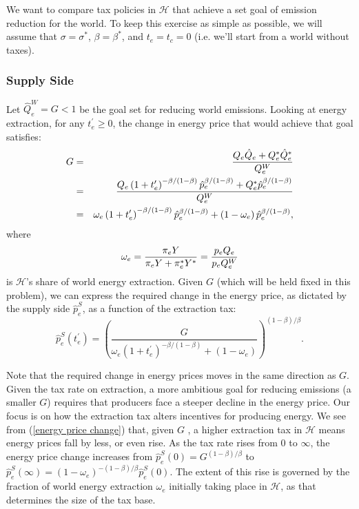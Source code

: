 \documentclass[notitlepage,12pt]{article}
\begin{document}
We want to compare tax policies in $\mathcal{H}$ that achieve a set goal of
emission reduction for the world. To keep this exercise as simple as
possible, we will assume that $\sigma =\sigma ^{\ast }$, $\beta =\beta
^{\ast }$, and $t_{e}=t_{c}=0$ (i.e. we'll start from a world without taxes).

\subsubsection{Supply Side}

Let $\hat{Q}_{e}^{W}=G<1$ be the goal set for reducing world emissions.
Looking at energy extraction, for any $t_{e}^{\prime }\geq 0$, the change in
energy price that would achieve that goal satisfies:%
\begin{eqnarray*}
G &=&\frac{Q_{e}\hat{Q}_{e}+Q_{e}^{\ast }\hat{Q}_{e}^{\ast }}{Q_{e}^{W}} \\
&=&\frac{Q_{e}\left( 1+t_{e}^{\prime }\right) ^{-\beta /(1-\beta )}\hat{p}%
_{e}^{\beta /(1-\beta )}+Q_{e}^{\ast }\hat{p}_{e}^{\beta /(1-\beta )}}{%
Q_{e}^{W}} \\
&=&\omega _{e}\left( 1+t_{e}^{\prime }\right) ^{-\beta /(1-\beta )}\hat{p}%
_{e}^{\beta /(1-\beta )}+\left( 1-\omega _{e}\right) \hat{p}_{e}^{\beta
/(1-\beta )},
\end{eqnarray*}%
where%
\begin{equation*}
\omega _{e}=\frac{\pi _{e}Y}{\pi _{e}Y+\pi _{e}^{\ast }Y^{\ast }}=\frac{%
p_{e}Q_{e}}{p_{e}Q_{e}^{W}}
\end{equation*}%
is $\mathcal{H}$'s share of world energy extraction. Given $G$ (which will
be held fixed in this problem), we can express the required change in the
energy price, as dictated by the supply side $\hat{p}_{e}^{S}$, as a
function of the extraction tax:%
\begin{equation}
\hat{p}_{e}^{S}(t_{e}^{\prime })=\left( \frac{G}{\omega _{e}\left(
1+t_{e}^{\prime }\right) ^{-\beta /(1-\beta )}+\left( 1-\omega _{e}\right) }%
\right) ^{\left( 1-\beta \right) /\beta }.  \label{energy price change}
\end{equation}

Note that the required change in energy prices moves in the same direction
as $G$. Given the tax rate on extraction, a more ambitious goal for reducing
emissions (a smaller $G$) requires that producers face a steeper decline in
the energy price. Our focus is on how the extraction tax alters incentives
for producing energy. We see from (\ref{energy price change}) that, given $G$%
, a higher extraction tax in $\mathcal{H}$ means energy prices fall by less,
or even rise. As the tax rate rises from $0$ to $\infty $, the energy price
change increases from $\hat{p}_{e}^{S}(0)=G^{(1-\beta )/\beta }$ to $\hat{p}%
_{e}^{S}(\infty )=\left( 1-\omega _{e}\right) ^{-(1-\beta )/\beta }\hat{p}%
_{e}^{S}(0)$. The extent of this rise is governed by the fraction of world
energy extraction $\omega _{e}$ initially taking place in $\mathcal{H}$, as
that determines the size of the tax base.
\end{document}
